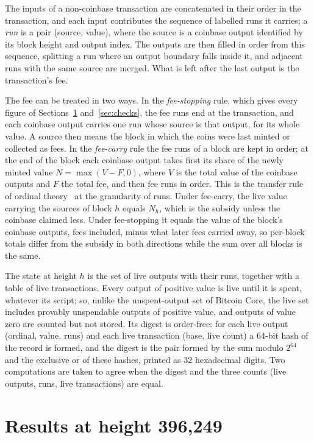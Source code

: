 \documentclass[11pt]{amsart}
\begin{document}
The inputs of a non-coinbase transaction are concatenated in their order in the transaction, and each input contributes the sequence of labelled runs it carries; a \emph{run} is a pair (source, value), where the source is a coinbase output identified by its block height and output index. The outputs are then filled in order from this sequence, splitting a run where an output boundary falls inside it, and adjacent runs with the same source are merged. What is left after the last output is the transaction's fee.

The fee can be treated in two ways. In the \emph{fee-stopping} rule, which gives every figure of Sections~\ref{sec:res} and~\ref{sec:checks}, the fee runs end at the transaction, and each coinbase output carries one run whose source is that output, for its whole value. A source then means the block in which the coins were last minted or collected as fees. In the \emph{fee-carry} rule the fee runs of a block are kept in order; at the end of the block each coinbase output takes first its share of the newly minted value $N = \max(V - F, 0)$, where $V$ is the total value of the coinbase outputs and $F$ the total fee, and then fee runs in order. This is the transfer rule of ordinal theory~\cite{Ord} at the granularity of runs. Under fee-carry, the live value carrying the sources of block $h$ equals $N_h$, which is the subsidy unless the coinbase claimed less. Under fee-stopping it equals the value of the block's coinbase outputs, fees included, minus what later fees carried away, so per-block totals differ from the subsidy in both directions while the sum over all blocks is the same.

The state at height $h$ is the set of live outputs with their runs, together with a table of live transactions. Every output of positive value is live until it is spent, whatever its script; so, unlike the unspent-output set of Bitcoin Core, the live set includes provably unspendable outputs of positive value, and outputs of value zero are counted but not stored. Its digest is order-free: for each live output (ordinal, value, runs) and each live transaction (base, live count) a $64$-bit hash of the record is formed, and the digest is the pair formed by the sum modulo $2^{64}$ and the exclusive or of these hashes, printed as $32$ hexadecimal digits. Two computations are taken to agree when the digest and the three counts (live outputs, runs, live transactions) are equal.

\section{Results at height 396{,}249}\label{sec:res}
\end{document}
